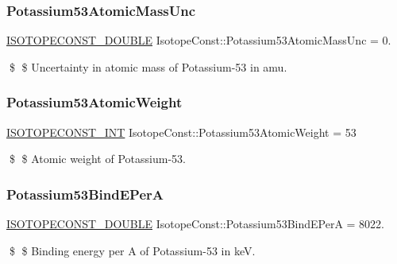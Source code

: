 \subsubsection{\texorpdfstring{Potassium53\+Atomic\+Mass\+Unc}{Potassium53AtomicMassUnc}}
{\footnotesize\ttfamily \mbox{\hyperlink{group___isotope_const-_macros_ga8f45a7272ce02c0b4c65c44636ed719a}{I\+S\+O\+T\+O\+P\+E\+C\+O\+N\+S\+T\+\_\+\+D\+O\+U\+B\+LE}} Isotope\+Const\+::\+Potassium53\+Atomic\+Mass\+Unc = 0.}

\$ \$ Uncertainty in atomic mass of Potassium-\/53 in amu. \mbox{\label{group___isotope_const-_potassium-_k53_ga1bba36a9609a26e6d2e973e8710ff3fb}} 
\subsubsection{\texorpdfstring{Potassium53\+Atomic\+Weight}{Potassium53AtomicWeight}}
{\footnotesize\ttfamily \mbox{\hyperlink{group___isotope_const-_macros_ga5f18360b3e99483a35c32d789e62621c}{I\+S\+O\+T\+O\+P\+E\+C\+O\+N\+S\+T\+\_\+\+I\+NT}} Isotope\+Const\+::\+Potassium53\+Atomic\+Weight = 53}

\$ \$ Atomic weight of Potassium-\/53. \mbox{\label{group___isotope_const-_potassium-_k53_ga822569615552201d1e3c2e48bad92420}} 
\subsubsection{\texorpdfstring{Potassium53\+Bind\+E\+PerA}{Potassium53BindEPerA}}
{\footnotesize\ttfamily \mbox{\hyperlink{group___isotope_const-_macros_ga8f45a7272ce02c0b4c65c44636ed719a}{I\+S\+O\+T\+O\+P\+E\+C\+O\+N\+S\+T\+\_\+\+D\+O\+U\+B\+LE}} Isotope\+Const\+::\+Potassium53\+Bind\+E\+PerA = 8022.}

\$ \$ Binding energy per A of Potassium-\/53 in keV. \mbox{\label{group___isotope_const-_potassium-_k53_ga4c7206a7f310cde0ee1bf47e2223dea5}} 
